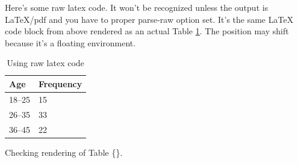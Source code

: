 \documentclass[\pandocDocMode,longtable,noextraspace,floatsintext]{apa6}
\begin{document}
Here's some raw latex code. It won't be recognized unless the output is
LaTeX/pdf and you have to proper parse-raw option set. It's the same
LaTeX code block from above rendered as an actual Table
\ref{tbl:rawtex}. The position may shift because it's a floating
environment.

\begin{table}
\centering
\caption{Using raw latex code}
\label{tbl:rawtex}
\begin{tabular}{|l|l|}\hline
Age & Frequency \\ \hline
18--25  & 15 \\
26--35  & 33 \\
36--45  & 22 \\ \hline
\end{tabular}
\end{table}

Checking rendering of Table \{\textcite{tbl:tbllong}\}.
\end{document}
